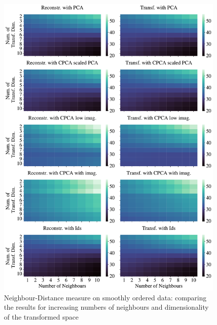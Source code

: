 \documentclass[pdftex,12pt,a4paper]{report}
\begin{document}
\begin{figure}
    \includegraphics[width = \textwidth]{images/multiple_runs/cpca/one_line/num_neigh_vs_dyn_low/euclidean_10runs_5lines_100points_10neighbours.pdf}
    \caption{Neighbour-Distance measure on smoothly ordered data: comparing the results for increasing numbers of neighbours and dimensionality of the transformed space}\label{fig:cpca-num_neigh_vs_dyn_low-oneline-euclidean}
\end{figure}
\end{document}
